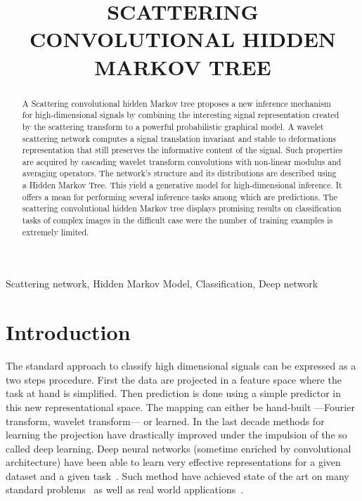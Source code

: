 \documentclass{article}
\title{SCATTERING CONVOLUTIONAL HIDDEN MARKOV TREE}
\begin{document}
%
\maketitle
%
\begin{abstract}
  A Scattering convolutional hidden Markov tree proposes a new inference mechanism for high-dimensional signals by combining the interesting signal representation created by the scattering transform to a powerful probabilistic graphical model.
  A wavelet scattering network computes a signal translation invariant and stable to deformations representation that still preserves the informative content of the signal. Such properties are acquired by cascading wavelet transform convolutions with non-linear modulus and averaging operators.
  The network's structure and its distributions are described using a Hidden Markov Tree. This yield a generative model for high-dimensional inference. It offers a mean for performing several inference tasks among which are predictions. The scattering convolutional hidden Markov tree displays promising results on classification tasks of complex images in the difficult case were the number of training examples is extremely limited.
\end{abstract}
%
\begin{keywords}
  Scattering network, Hidden Markov Model, Classification, Deep network
\end{keywords}
%
\section{Introduction}
\label{sec:Intro}

  The standard approach to classify high dimensional signals can be expressed as a two steps procedure. First the data are projected in a feature space where the task at hand is simplified. Then prediction is done using a simple predictor in this new representational space. The mapping can either be hand-built ---\eg Fourier transform, wavelet transform--- or learned. In the last decade methods for learning the projection have drastically improved under the impulsion of the so called deep learning. Deep neural networks (sometime enriched by convolutional architecture) have been able to learn very effective representations for a given dataset and a given task~\citep{DNN, CNN}. Such method have achieved state of the art on many standard problems~\citep{alexNet} as well as real world applications~\citep{microsoft cortana}. 
  
\end{document}
